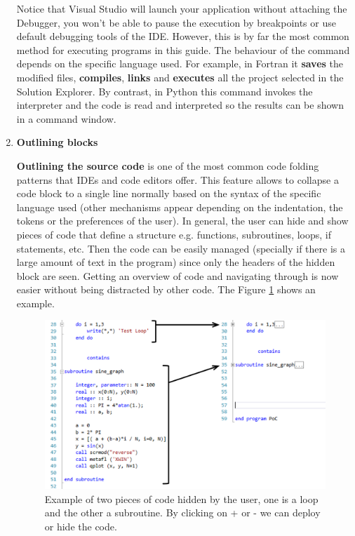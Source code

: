 \begin{enumerate}
    Notice that Visual Studio will launch your application without attaching the Debugger, you won't be able to pause the execution by breakpoints or use default debugging tools of the IDE. However, this is by far the most common method for executing programs in this guide. The behaviour of the command depends on the specific language used. For example, in Fortran it \textbf{saves} the modified files, \textbf{compiles}, \textbf{links} and \textbf{executes} all the project selected in the Solution Explorer. By contrast, in Python this command invokes the interpreter and the code is read and interpreted so the results can be shown in a command window.
    
    \item \textbf{Outlining blocks}
    
    \textbf{Outlining the source code} is one of the most common code folding patterns that IDEs and code editors offer. This feature allows to collapse a code block to a single line normally based on the syntax of the specific language used (other mechanisms appear depending on the indentation, the tokens or the preferences of the user). In general, the user can hide and show pieces of code that define a structure e.g. functions, subroutines, loops, if statements, etc. Then the code can be easily managed (specially if there is a large amount of text in the program) since only the headers of the hidden block are seen. Getting an overview of code and navigating through is now easier without being distracted by other code. The Figure \ref{fig:Outlining} shows an example.
    
    \begin{figure}
        \centering
        \includegraphics[width= \textwidth]{Figures/Outlining}
        \caption{Example of two pieces of code hidden by the user, one is a loop and the other a subroutine. By clicking on + or - we can deploy or hide the code.}
        \label{fig:Outlining}
    \end{figure}


\end{enumerate}
